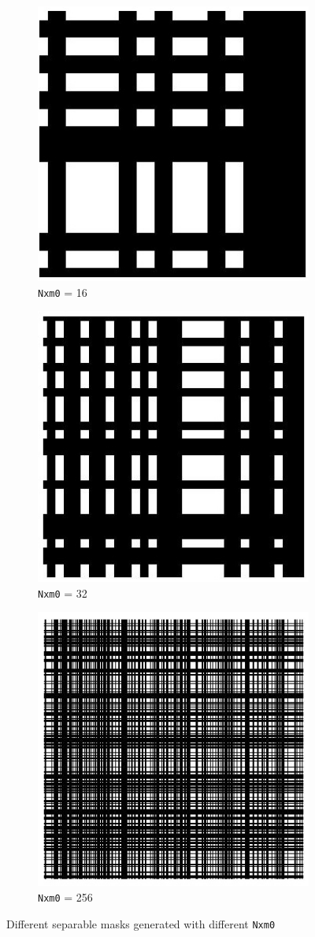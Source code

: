  \begin{figure}[ht]
    \centering
    \begin{subfigure}{0.5\textwidth}
    \centering
        \includegraphics[width=0.5\linewidth]{pics/mask_16}
        \caption{\texttt{Nxm0} = 16}
        \label{fig:mask-16}
    \end{subfigure}%
    \begin{subfigure}{0.5\textwidth}
    \centering
        \includegraphics[width=0.5\linewidth]{pics/mask_32}
        \caption{\texttt{Nxm0} = 32}
        \label{fig:mask-32}
    \end{subfigure}
    
    \begin{subfigure}{0.5\textwidth}
    \centering
        \includegraphics[width=0.5\linewidth]{pics/mask_256}
        \caption{\texttt{Nxm0} = 256}
        \label{fig:mask-256}
    \end{subfigure}%
    \caption{Different separable masks generated with different \texttt{Nxm0}}
    \label{fig:exptests}
    \end{figure}

